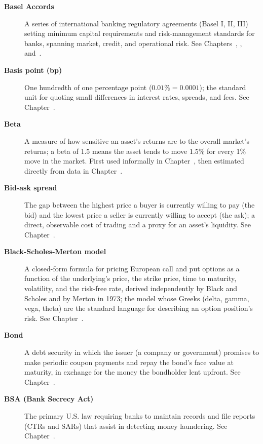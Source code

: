\documentclass[../ai_in_finance]{subfiles}
\begin{document}
\begin{description}
\item[\textbf{Basel Accords}] A series of international banking regulatory agreements (Basel I, II, III) setting minimum capital requirements and risk-management standards for banks, spanning market, credit, and operational risk. See Chapters~, , and~.

\item[\textbf{Basis point (bp)}] One hundredth of one percentage point ($0.01\% = 0.0001$); the standard unit for quoting small differences in interest rates, spreads, and fees. See Chapter~.

\item[\textbf{Beta}] A measure of how sensitive an asset's returns are to the overall market's returns; a beta of 1.5 means the asset tends to move 1.5\% for every 1\% move in the market. First used informally in Chapter~, then estimated directly from data in Chapter~.

\item[\textbf{Bid-ask spread}] The gap between the highest price a buyer is currently willing to pay (the bid) and the lowest price a seller is currently willing to accept (the ask); a direct, observable cost of trading and a proxy for an asset's liquidity. See Chapter~.

\item[\textbf{Black-Scholes-Merton model}] A closed-form formula for pricing European call and put options as a function of the underlying's price, the strike price, time to maturity, volatility, and the risk-free rate, derived independently by Black and Scholes and by Merton in 1973; the model whose Greeks (delta, gamma, vega, theta) are the standard language for describing an option position's risk. See Chapter~.

\item[\textbf{Bond}] A debt security in which the issuer (a company or government) promises to make periodic coupon payments and repay the bond's face value at maturity, in exchange for the money the bondholder lent upfront. See Chapter~.

\item[\textbf{BSA (Bank Secrecy Act)}] The primary U.S. law requiring banks to maintain records and file reports (CTRs and SARs) that assist in detecting money laundering. See Chapter~.


\end{description}
\end{document}
